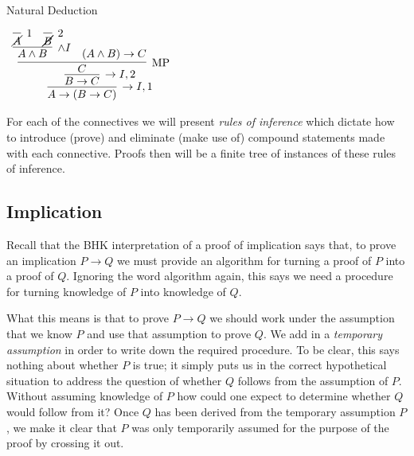 \documentclass{book}
\begin{document}
    \vspace{0.1cm}

    \begin{eg}{Natural Deduction}
            \begin{center}
                $\begin{array}{c}
                    \infer[\to I,1]{A \to (B \to C)}
                        {\infer[\to I,2]{B \to C}
                            {\infer[\MP]{C}
                                {\infer[\land I]{A \land B}
                                    {\infer[1]{\cancel{A}}{} & \infer[2]{\cancel{B}}{}}
                                &							
                                (A \land B) \to C}}}
                \end{array}$
            \end{center}
        \end{eg}

    For each of the connectives we will present \emph{rules of inference} which dictate how to introduce (prove) and eliminate (make use of) compound statements made with each connective. Proofs then will be a finite tree of instances of these rules of inference. 

    
    \newpage
    \subsection*{Implication}

    Recall that the BHK interpretation of a proof of implication says that, to prove an implication $P \to Q$ we must provide an algorithm for turning a proof of $P$ into a proof of $Q$. Ignoring the word algorithm again, this says we need a procedure for turning knowledge of $P$ into knowledge of $Q$. 

    What this means is that to prove $P \to Q$ we should work under the assumption that we know $P$ and use that assumption to prove $Q$. We add in a \emph{temporary assumption} in order to write down the required procedure. To be clear, this says nothing about whether $P$ is true; it simply puts us in the correct hypothetical situation to address the question of whether $Q$ follows from the assumption of $P$. Without assuming knowledge of $P$ how could one expect to determine whether $Q$ would follow from it? Once $Q$ has been derived from the temporary assumption $P$, we make it clear that $P$ was only temporarily assumed for the purpose of the proof by crossing it out. 

    \vspace{0.1cm}
\end{document}

